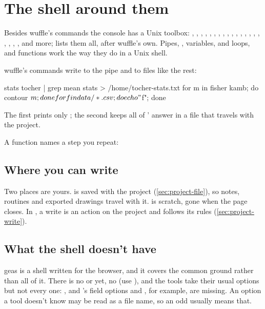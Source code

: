 \section{The shell around them}\label{sec:shell}

Besides wuffle's commands the console has a Unix toolbox: , , ,
, , , , , , , ,
, , , , , , , ,
,  and more;  lists them all, after wuffle's own. Pipes, ,
variables,  and  loops,  and functions work the way they do in a Unix
shell.

wuffle's commands write to the pipe and to files like the rest:

\begin{codeblock}
stats tocher | grep mean
stats > /home/tocher-stats.txt
for m in fisher kamb; do contour $m; done
for f in data/*.csv; do echo "$f"; done
\end{codeblock}

The first prints only ; the second keeps all of
' answer in a file that travels with the project.

A function names a step you repeat:


\subsection{Where you can write}\label{sec:home}

Two places are yours.  is saved with the project (\cref{sec:project-file}), so notes,
routines and exported drawings travel with it.  is scratch, gone when the page closes. In
, a write is an action on the project and follows its rules (\cref{sec:project-write}).

\subsection{What the shell doesn't have}

geas is a shell written for the browser, and it covers the common ground rather than all of it. There is
no  or  yet, no  (use ), and the tools take their usual
options but not every one: ,  and 's field options  and
, for example, are missing. An option a tool doesn't know may be read as a file name, so an
odd  usually means that.

